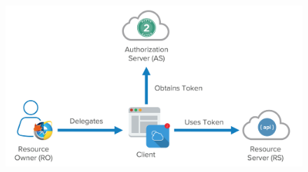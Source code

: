 \documentclass{beamer}
\begin{document}
	\begin{frame}
		\frametitle{}
		\begin{figure}[hbt!]
			\includegraphics[scale=2.5,height=0.5\paperwidth,keepaspectratio]{oauth-actors.png}
		\end{figure}
			
	\end{frame}
\end{document}
